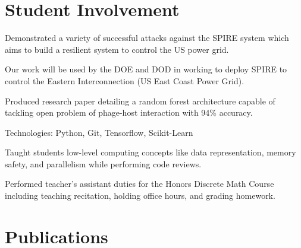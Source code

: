 \documentclass[]{deedy-resume-openfont}
\begin{document}
\begin{minipage}[t]{0.64\textwidth}
\section{Student Involvement}
\descript{}
\begin{tightemize}
    \item Demonstrated a variety of successful attacks against the SPIRE system which aims
    to build a resilient system to control the US power grid.
    \item Our work will be used by the DOE and DOD in working to deploy SPIRE to control 
    the Eastern Interconnection (US East Coast Power Grid).
\end{tightemize}
\sectionsep
{}
\begin{tightemize}
    \item Produced research paper detailing a random forest architecture capable of tackling 
    open problem of phage-host interaction with 94\% accuracy. 
    \item Technologies: Python, Git, Tensorflow, Scikit-Learn
\end{tightemize}
\sectionsep

\descript{}
\begin{tightemize}
    \item Taught students low-level computing concepts like data representation, 
    memory safety, and parallelism while performing code reviews.
    \item Performed teacher's assistant duties for the Honors Discrete Math Course including 
    teaching recitation, holding office hours, and grading homework.
\end{tightemize}
\sectionsep



\section{Publications} 
\renewcommand\refname{\vskip -1.5em} %


\nocite{*}

\end{minipage} 
\end{document}
